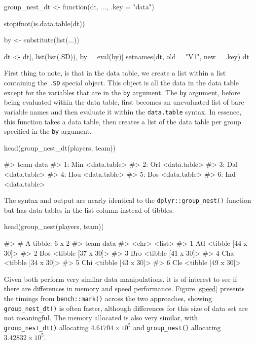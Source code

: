\begin{Schunk}
\begin{Sinput}
group_nest_dt <- function(dt, ..., .key = "data"){
  stopifnot(is.data.table(dt))

  by <- substitute(list(...))
  
  dt <- dt[, list(list(.SD)), by = eval(by)]
  setnames(dt, old = "V1", new = .key)
  dt
}
\end{Sinput}
\end{Schunk}

First thing to note, is that in the data table, we create a list within
a list containing the \texttt{.SD} special object. This object is all
the data in the data table except for the variables that are in the
\texttt{by} argument. The \texttt{by} argument, before being evaluated
within the data table, first becomes an unevaluated list of bare
variable names and then evaluate it within the \texttt{data.table}
syntax. In essence, this function takes a data table, then creates a
list of the data table per group specified in the \texttt{by} argument.

\begin{Schunk}
\begin{Sinput}
head(group_nest_dt(players, team))
\end{Sinput}
\begin{Soutput}
#>    team         data
#> 1:  Min <data.table>
#> 2:  Orl <data.table>
#> 3:  Dal <data.table>
#> 4:  Hou <data.table>
#> 5:  Bos <data.table>
#> 6:  Ind <data.table>
\end{Soutput}
\end{Schunk}

The syntax and output are nearly identical to the
\texttt{dplyr::group\_nest()} function but has data tables in the
list-column instead of tibbles.

\begin{Schunk}
\begin{Sinput}
head(group_nest(players, team))
\end{Sinput}
\begin{Soutput}
#> # A tibble: 6 x 2
#>   team  data              
#>   <chr> <list>            
#> 1 Atl   <tibble [44 x 30]>
#> 2 Bos   <tibble [37 x 30]>
#> 3 Bro   <tibble [41 x 30]>
#> 4 Cha   <tibble [34 x 30]>
#> 5 Chi   <tibble [43 x 30]>
#> 6 Cle   <tibble [49 x 30]>
\end{Soutput}
\end{Schunk}

Given both perform very similar data manipulations, it is of interest to
see if there are differences in memory and speed performance. Figure
\ref{speed} presents the timings from \texttt{bench::mark()} across the
two approaches, showing \texttt{group\_nest\_dt()} is often faster,
although differences for this size of data set are not meaningful. The
memory allocated is also very similar, with \texttt{group\_nest\_dt()}
allocating \ensuremath{4.61704\times 10^{5}} and \texttt{group\_nest()}
allocating \ensuremath{3.42832\times 10^{5}}.

